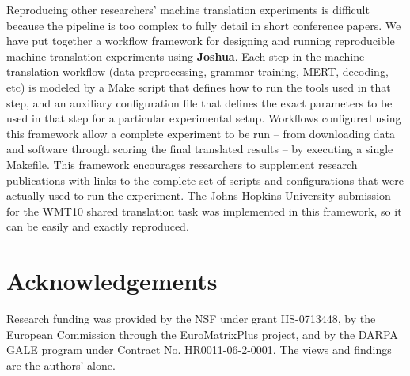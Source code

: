 \documentclass[11pt]{article}
\newcommand{\joshua}{\textbf{Joshua}\xspace}
\begin{document}
Reproducing other researchers' machine translation experiments is difficult because the pipeline is too complex to fully detail in short conference papers. We have put together a workflow framework for designing and running reproducible machine translation experiments using \joshua \cite{Schwartz-wmt10-pipline}. Each step in the machine translation workflow (data preprocessing, grammar training, MERT, decoding, etc) is modeled by a Make script that defines how to run the tools used in that step, and an auxiliary configuration file that defines the exact parameters to be used in that step for a particular experimental setup. Workflows configured using this framework allow a complete experiment to be run -- from downloading data and software through scoring the final translated results -- by executing a single Makefile.
This framework encourages researchers to supplement research publications with links to the complete set of scripts and configurations that were actually used to run the experiment. The Johns Hopkins University submission for the WMT10 shared translation task was implemented in this framework, so it can be easily and exactly reproduced.


\section*{Acknowledgements}

Research funding was provided by the NSF under grant IIS-0713448, by the European Commission through the EuroMatrixPlus project, and by the DARPA GALE program under Contract No. HR0011-06-2-0001. The views and findings are the authors' alone.




\end{document}
